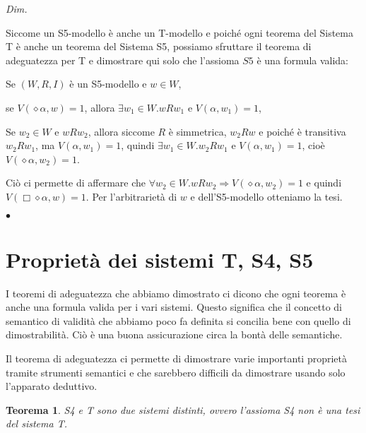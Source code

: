 \documentclass[a4paper, titlepage, 12pt]{report}
\newtheorem{theorem}{Teorema}[chapter]
\newenvironment{proof}
    {\textit{Dim.}
    }
    {\begin{flushright}$\bullet$\end{flushright}
    }
\begin{document}
\begin{proof}
Siccome un S5-modello è anche un T-modello e poiché ogni teorema del Sistema T
è anche un teorema del Sistema S5, possiamo sfruttare il teorema di adeguatezza per T
e dimostrare qui solo che l'assioma $S5$ è una formula valida:

Se $(W, R, I)$ è un S5-modello e $w \in W$,

se $V(\diamond \alpha, w) = 1$, allora $\exists w_1 \in W. wRw_1$ e $V(\alpha, w_1) = 1$,

Se $w_2 \in W$ e $wRw_2$, allora siccome $R$ è simmetrica, $w_2Rw$ e poiché
è transitiva $w_2Rw_1$, ma $V(\alpha, w_1) = 1$, quindi
$\exists w_1 \in W. w_2Rw_1$ e $V(\alpha, w_1) = 1$, cioè $V(\diamond \alpha, w_2) = 1$.

Ciò ci permette di affermare che $\forall w_2 \in W. wRw_2 \Rightarrow V(\diamond \alpha, w_2) = 1$
e quindi $V(\Box \diamond \alpha, w) = 1$.
Per l'arbitrarietà di $w$ e dell'S5-modello otteniamo la tesi.
\end{proof}

\section{Proprietà dei sistemi T, S4, S5}
I teoremi di adeguatezza che abbiamo dimostrato ci dicono che ogni teorema
è anche una formula valida per i vari sistemi.
Questo significa che il concetto di semantico di validità che abbiamo poco fa definita
si concilia bene con quello di dimostrabilità. Ciò è una buona assicurazione circa
la bontà delle semantiche.

Il teorema di adeguatezza ci permette di dimostrare varie importanti proprietà tramite
strumenti semantici e che sarebbero difficili da dimostrare usando solo l'apparato deduttivo.

\begin{theorem}
S4 e T sono due sistemi distinti, ovvero l'assioma S4 non è una tesi del sistema T.
\end{theorem}
\end{document}
